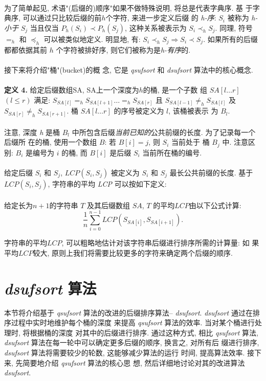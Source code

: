 \documentclass{ws-ijprai}
\begin{document}
\\
为了简单起见, 术语"(后缀的)顺序"如果不做特殊说明, 将总是代表字典序. 基
于字典序, 可以通过只比较后缀的前$h$个字符, 来进一步定义后缀
的 \emph{h-序}: $S_i$ 被称为 \emph{h-小于} $S_j$ 当且仅当 $P_h(S_i)
\prec P_h(S_j)$, 这种关系被表示为 $S_i \prec_h S_j$.  同理, 符号
$=_h$ 和 $\preceq_h$ 可以被类似地定义. 明显地, 有: $S_i \prec_h S_j
\Longrightarrow S_i \prec S_j$. 如果所有的后缀都都依据其前
$h$ 个字符被排好序, 则它们被称为是\emph{h-有序}的.\\
\\
接下来将介绍"桶"(bucket)的概
念, 它是 \emph{qsufsort} 和 \emph{dsufsort} 算法中的核心概念.\\
\\
\textbf{定义 4.} 给定后缀数组SA, SA上一个深度为$h$的桶, 是一个子数
组 $SA[l \dots r]$ $(l \leq r)$ 满足: $S_{SA[l]} =_h S_{SA[l+1]}\dots
=_h S_{SA[r]}$ 且 $S_{SA[l-1]} \neq_h S_{SA[l]}$ 及 $S_{SA[r]} \neq_h
S_{SA[r+1]}$. 桶 $SA[l \dots r]$ 的序号被定义为 $l$, 该桶被表示
为 $B_l$.\\
\\
注意, 深度 \emph{h} 是桶
$B_l$ 中所包含后缀\emph{当前已知的}公共前缀的长度. 为了记录每一个后缀所
在的桶, 使用一个数组 $B$: 若 $B[i] = j$, 则 $S_i$ 当前处于
桶 $B_j$ 中. 注意区别: $B_i$ 是编号为 $i$ 的桶, 而 $B[i]$ 是后缀
$S_i$ 当前所在桶的编号.\\
\\
给定后缀 $S_i$ 和 $S_j$, $LCP(S_i, S_j)$ 被定义为 $S_i$ 和
$S_j$ 最长公共前缀的长度. 基于 $LCP(S_i,
S_j)$, 字符串的平均 \emph{LCP} 可以按如下定义:\\
\\
给定长为$n+1$的字符串 $T$ 及其后缀数组 $SA$, $T$
的平均$LCP$由以下公式计算:\\

\begin{equation}
\frac{1}{n}\sum_{i=0}^{n-1}LCP(S_{SA[i]},S_{SA[i+1]}).
\end{equation}

字符串的平均$LCP$, 可以粗略地估计对该字符串后缀进行排序所需的计算量: 如
果平均$LCP$较大, 原则上我们将需要比较更多的字符来确定两个后缀的顺序.

\section{ \emph{dsufsort} 算法}

本节将介绍基于 \emph{qsufsort} 算法的改进的后缀排序算法--
\emph{dsufsort}. \emph{dsufsort} 通过在排序过程中实时地维护每个桶的深度
来提高 \emph{qsufsort} 算法的效率. 当对某个桶进行处理时, 将根据桶的深度
对其中的后缀进行排序. 通过这种方式, 相比 \emph{qsufsort} 算法,
\emph{dsufsort} 算法在每一轮中可以确定更多后缀的顺序, 换言之, 对所有后
缀进行排序, \emph{dsufsort} 算法将需要较少的轮数, 这能够减少算法的运行
时间, 提高算法效率. 接下来, 先简要地介绍 \emph{qsufsort} 算法的核心思
想, 然后详细地讨论对其的改进算法 \emph{dsufsort}.
\end{document}
